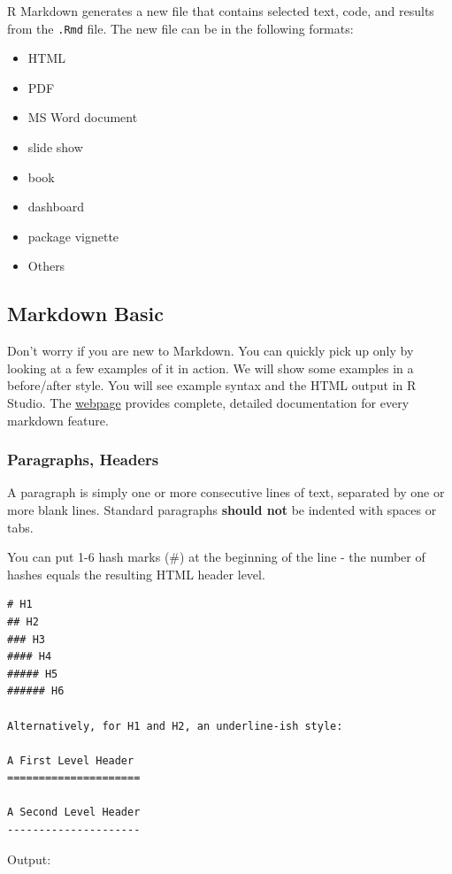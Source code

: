 \documentclass[]{book}
\providecommand{\tightlist}{%
  \setlength{\itemsep}{0pt}\setlength{\parskip}{0pt}}
\theoremstyle{definition}
\theoremstyle{definition}
\theoremstyle{remark}
\begin{document}
R Markdown generates a new file that contains selected text, code, and
results from the \texttt{.Rmd} file. The new file can be in the
following formats:

\begin{itemize}
\tightlist
\item
  HTML
\item
  PDF
\item
  MS Word document
\item
  slide show
\item
  book
\item
  dashboard
\item
  package vignette
\item
  Others
\end{itemize}

\subsection{Markdown Basic}\label{markdown-basic}

Don't worry if you are new to Markdown. You can quickly pick up only by
looking at a few examples of it in action. We will show some examples in
a before/after style. You will see example syntax and the HTML output in
R Studio. The
\href{https://daringfireball.net/projects/markdown/syntax}{webpage}
provides complete, detailed documentation for every markdown feature.

\subsubsection{Paragraphs, Headers}\label{paragraphs-headers}

A paragraph is simply one or more consecutive lines of text, separated
by one or more blank lines. Standard paragraphs \textbf{should not} be
indented with spaces or tabs.

You can put 1-6 hash marks (\#) at the beginning of the line - the
number of hashes equals the resulting HTML header level.

\begin{verbatim}
# H1
## H2
### H3
#### H4
##### H5
###### H6

Alternatively, for H1 and H2, an underline-ish style:

A First Level Header
=====================

A Second Level Header
---------------------
\end{verbatim}

Output:
\end{document}
